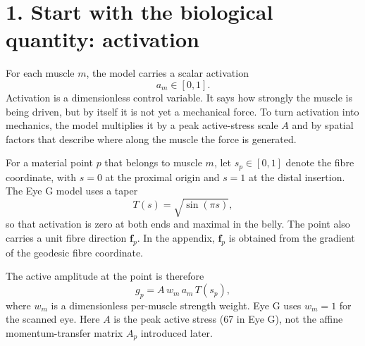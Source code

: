\documentclass[11pt]{article}
\newcommand{\vect}[1]{\bm{#1}}
\begin{document}
\section*{1. Start with the biological quantity: activation}
For each muscle $m$, the model carries a scalar activation
\begin{equation}
 a_m \in [0,1].
\label{eq:auto1}
\end{equation}
Activation is a dimensionless control variable. It says how strongly the muscle is being driven, but by itself it is not yet a mechanical force. To turn activation into mechanics, the model multiplies it by a peak active-stress scale $A$ and by spatial factors that describe where along the muscle the force is generated.

For a material point $p$ that belongs to muscle $m$, let $s_p\in[0,1]$ denote the fibre coordinate, with $s=0$ at the proximal origin and $s=1$ at the distal insertion. The Eye G model uses a taper
\begin{equation}
T(s)=\sqrt{\sin(\pi s)},
\label{eq:auto2}
\end{equation}
so that activation is zero at both ends and maximal in the belly. The point also carries a unit fibre direction $\vect f_p$. In the appendix, $\vect f_p$ is obtained from the gradient of the geodesic fibre coordinate.

The active amplitude at the point is therefore
\begin{equation}
 g_p = A\,w_m\,a_m\,T(s_p),
\label{eq:auto3}
\end{equation}
where $w_m$ is a dimensionless per-muscle strength weight. Eye G uses $w_m=1$ for the scanned eye. Here $A$ is the peak active stress (67 in Eye G), not the affine momentum-transfer matrix $A_p$ introduced later.
\end{document}
